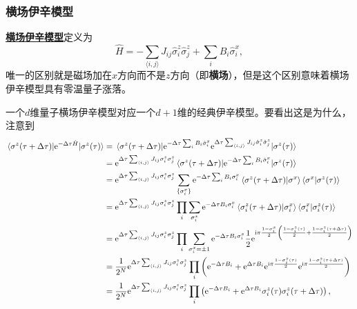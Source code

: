 \documentclass[hyperref, UTF8, a4paper]{ctexart}
\newcommand*{\ii}{\mathrm{i}}
\newcommand*{\ee}{\mathrm{e}}
\newcommand*{\pair}[1]{\langle #1 \rangle}
\renewcommand{\emph}[1]{\textbf{#1}}
\newcommand*{\concept}[1]{\underline{\textbf{#1}}}
\begin{document}
\subsubsection{横场伊辛模型}

\concept{横场伊辛模型}定义为
\begin{equation}
    \hat{H} = - \sum_{\pair{i, j}} J_{ij} \hat{\sigma}_i^z \hat{\sigma}_j^z + \sum_{i} B_i \hat{\sigma}_i^x,
\end{equation}
唯一的区别就是磁场加在$x$方向而不是$z$方向（即\emph{横场}），但是这个区别意味着横场伊辛模型具有零温量子涨落。

一个$d$维量子横场伊辛模型对应一个$d+1$维的经典伊辛模型。要看出这是为什么，注意到
\[
    \begin{aligned}
        \mel{\sigma^z(\tau + \Delta \tau)}{\ee^{-\Delta \tau \hat{H}}}{\sigma^z(\tau)} &= \mel{\sigma^z(\tau + \Delta \tau)}{\ee^{-\Delta \tau \sum_i B_i \hat{\sigma}^x_i} \ee^{\Delta \tau \sum_{\pair{i, j}} J_{ij} \hat{\sigma}_i^z \hat{\sigma}_j^z}}{\sigma^z(\tau)} \\
        &= \ee^{\Delta \tau \sum_{\pair{i, j}} J_{ij} \sigma_i^z \sigma_j^z} \mel{\sigma^z(\tau + \Delta \tau)}{\ee^{-\Delta \tau \sum_i B_i \hat{\sigma}^x_i}}{\sigma^z(\tau)} \\
        &= \ee^{\Delta \tau \sum_{\pair{i, j}} J_{ij} \sigma_i^z \sigma_j^z} \sum_{\{\sigma^x_i\}} \ee^{-\Delta \tau \sum_i B_i \sigma^x_i} \braket{\sigma^z(\tau + \Delta \tau)}{\sigma^x} \braket{\sigma^x}{\sigma^z(\tau)} \\
        &= \ee^{\Delta \tau \sum_{\pair{i, j}} J_{ij} \sigma_i^z \sigma_j^z} \prod_{i} \sum_{\sigma^x_i} \ee^{-\Delta \tau B_i \sigma^x_i} \braket{\sigma^z_i(\tau + \Delta \tau)}{\sigma^x_i} \braket{\sigma^x_i}{\sigma^z_i(\tau)} \\
        &= \ee^{\Delta \tau \sum_{\pair{i, j}} J_{ij} \sigma_i^z \sigma_j^z} \prod_{i} \sum_{\sigma^x_i = \pm 1} \ee^{-\Delta \tau B_i \sigma^x_i} \frac{1}{2} \ee^{\ii \pi \frac{1 - \sigma^x_i}{2} \left( \frac{1 - \sigma^z_i(\tau)}{2} + \frac{1 - \sigma^z_i(\tau + \Delta \tau)}{2} \right)} \\
        &= \frac{1}{2^N} \ee^{\Delta \tau \sum_{\pair{i, j}} J_{ij} \sigma_i^z \sigma_j^z} \prod_i \left( \ee^{- \Delta \tau B_i} + \ee^{\Delta \tau B_i} \ee^{\ii \pi \frac{1 - \sigma^z_i(\tau)}{2}} \ee^{\ii \pi \frac{1 - \sigma^z_i(\tau + \Delta \tau)}{2}} \right) \\
        &= \frac{1}{2^N} \ee^{\Delta \tau \sum_{\pair{i, j}} J_{ij} \sigma_i^z \sigma_j^z} \prod_i \left( \ee^{- \Delta \tau B_i} + \ee^{\Delta \tau B_i} \sigma^z_i(\tau) \sigma^z_i(\tau + \Delta \tau) \right),
    \end{aligned}
\]
\end{document}
